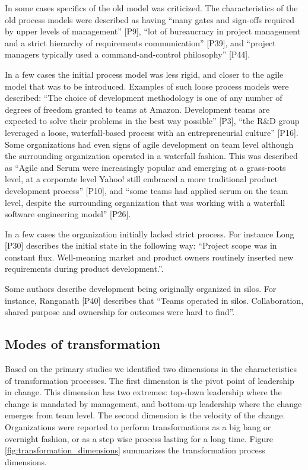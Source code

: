 In some cases specifics of the old model was criticized. The characteristics of
the old process models were described as having ``many gates and sign-offs
required by upper levels of management'' [P9], ``lot of bureaucracy in project
management and a strict hierarchy of requirements communication'' [P39], and
``project managers typically used a command-and-control philosophy'' [P44].

In a few cases the initial process model was less rigid, and closer to the agile
model that was to be introduced. Examples of such loose process models were
described: ``The choice of development methodology is one of any number of
degrees of freedom granted to teams at Amazon. Development teams are expected to
solve their problems in the best way possible'' [P3], ``the R\&D group leveraged
a loose, waterfall-based process with an entrepreneurial culture'' [P16]. Some
organizations had even signs of agile development on team level although the
surrounding organization operated in a waterfall fashion. This was described as
``Agile and Scrum were increasingly popular and emerging at a grass-roots level,
at a corporate level Yahoo! still embraced a more traditional product
development process'' [P10], and ``some teams had applied scrum on the team
level, despite the surrounding organization that was working with a waterfall
software engineering model'' [P26].

In a few cases the organization initially lacked strict process. For instance
Long [P30] describes the initial state in the following way: ``Project scope was
in constant flux. Well-meaning market and product owners routinely inserted new
requirements during product development.''.

Some authors describe development being originally organized in silos. For
instance, Ranganath [P40] describes that ``Teams operated in silos.
Collaboration, shared purpose and ownership for outcomes were hard to find''.


\subsection{Modes of transformation}

Based on the primary studies we identified two dimensions in the characteristics
of transformation processes. The first dimension is the pivot point of
leadership in change. This dimension has two extremes: top-down leadership where
the change is mandated by management, and bottom-up leadership where the change
emerges from team level. The second dimension is the velocity of the change.
Organizations were reported to perform transformations as a big bang or
overnight fashion, or as a step wise process lasting for a long time. Figure
\ref{fig:transformation_dimensions} summarizes the transformation process
dimensions.

